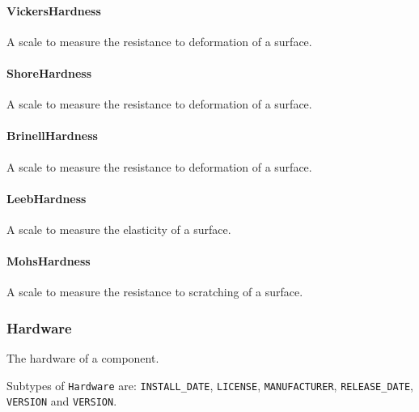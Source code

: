 \paragraph{VickersHardness}\mbox{}
\label{sec:VickersHardness}



A scale to measure the resistance to deformation of a surface.


\paragraph{ShoreHardness}\mbox{}
\label{sec:ShoreHardness}



A scale to measure the resistance to deformation of a surface.


\paragraph{BrinellHardness}\mbox{}
\label{sec:BrinellHardness}



A scale to measure the resistance to deformation of a surface.


\paragraph{LeebHardness}\mbox{}
\label{sec:LeebHardness}



A scale to measure the elasticity of a surface.


\paragraph{MohsHardness}\mbox{}
\label{sec:MohsHardness}



A scale to measure the resistance to scratching of a surface.


\subsubsection{Hardware}
\label{sec:Hardware}



The hardware of a component.


Subtypes of \texttt{Hardware} are: \texttt{INSTALL_DATE}, \texttt{LICENSE}, \texttt{MANUFACTURER}, \texttt{RELEASE_DATE}, \texttt{VERSION} and \texttt{VERSION}. 
\FloatBarrier

